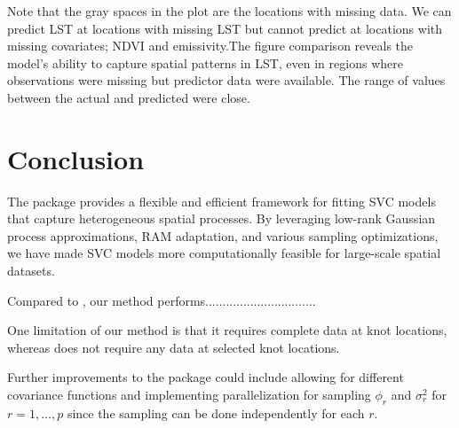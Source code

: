  Note that the gray spaces in the plot are the locations with missing data. We can predict LST at locations with missing LST but cannot predict at locations with missing covariates; NDVI and emissivity.The figure comparison reveals the model’s ability to capture spatial patterns in LST, even in regions where observations were missing but predictor data were available.
 The range of values between the actual and predicted were close.
 
\section{Conclusion}
\label{sec:Conclusion}
The  package provides a flexible and efficient framework for fitting SVC models that capture heterogeneous spatial processes. By leveraging low-rank Gaussian process approximations, RAM adaptation, and various sampling optimizations, we have made SVC models more computationally feasible for large-scale spatial datasets.

Compared to , our method performs................................

One limitation of our method is that it requires complete data at knot locations, whereas  does not require any data at selected knot locations.

Further improvements to the package could include allowing for different covariance functions and implementing parallelization for sampling $\phi_r$ and $\sigma_r^2$ for $r = 1, \dots, p$ since the sampling can be done independently for each $r$.

\newpage





